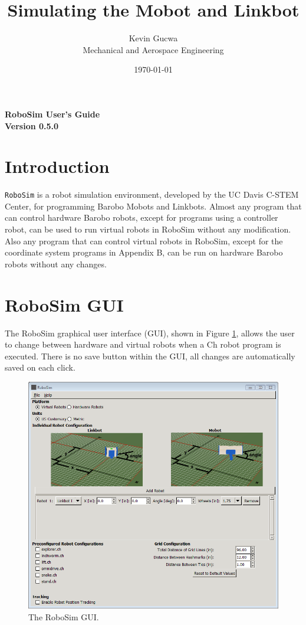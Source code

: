\documentclass{article}
\title{Simulating the Mobot and Linkbot}
\author{Kevin Gucwa\\Mechanical and Aerospace Engineering}
\date{\today}
\begin{document}
\begin{center}
{\Huge\sf\bf RoboSim User's Guide}\\
\vspace*{2.5cm}
{\Large\bf Version 0.5.0}
\vspace{4.5cm}
\end{center}

\newpage
\tableofcontents
\newpage

\section{Introduction}
\texttt{RoboSim} is a robot simulation environment, developed by the UC Davis
C-STEM Center, for programming Barobo Mobots and Linkbots.  Almost any program
that can control hardware Barobo robots, except for programs using a controller
robot, can be used to run virtual robots in RoboSim without any modification.
Also any program that can control virtual robots in RoboSim, except for the
coordinate system programs in Appendix B, can be run on hardware Barobo robots
without any changes.

\section{RoboSim GUI}
\label{sec:gui}
The RoboSim graphical user interface (GUI), shown in Figure \ref{fig:gui},
allows the user to change between hardware and virtual robots when a Ch robot
program is executed.  There is no save button within the GUI, all changes are
automatically saved on each click.
\begin{figure}[H]
	\begin{center}
		\includegraphics[width=6in]{images/gui}
	\end{center}
	\caption{The RoboSim GUI.}
	\label{fig:gui}
\end{figure}
\end{document}
